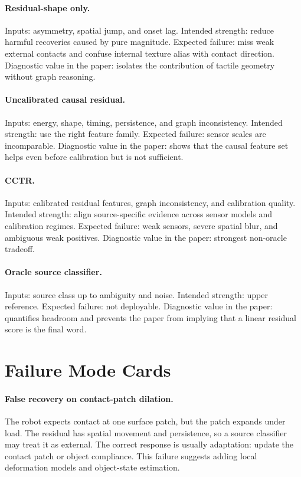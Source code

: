 \documentclass{article}
\newcommand{\method}{CCTR}
\begin{document}
\paragraph{Residual-shape only.}
Inputs: asymmetry, spatial jump, and onset lag. Intended strength: reduce harmful recoveries caused by pure magnitude. Expected failure: miss weak external contacts and confuse internal texture alias with contact direction. Diagnostic value in the paper: isolates the contribution of tactile geometry without graph reasoning.

\paragraph{Uncalibrated causal residual.}
Inputs: energy, shape, timing, persistence, and graph inconsistency. Intended strength: use the right feature family. Expected failure: sensor scales are incomparable. Diagnostic value in the paper: shows that the causal feature set helps even before calibration but is not sufficient.

\paragraph{\method{}.}
Inputs: calibrated residual features, graph inconsistency, and calibration quality. Intended strength: align source-specific evidence across sensor models and calibration regimes. Expected failure: weak sensors, severe spatial blur, and ambiguous weak positives. Diagnostic value in the paper: strongest non-oracle tradeoff.

\paragraph{Oracle source classifier.}
Inputs: source class up to ambiguity and noise. Intended strength: upper reference. Expected failure: not deployable. Diagnostic value in the paper: quantifies headroom and prevents the paper from implying that a linear residual score is the final word.

\section{Failure Mode Cards}

\paragraph{False recovery on contact-patch dilation.}
The robot expects contact at one surface patch, but the patch expands under load. The residual has spatial movement and persistence, so a source classifier may treat it as external. The correct response is usually adaptation: update the contact patch or object compliance. This failure suggests adding local deformation models and object-state estimation.
\end{document}
